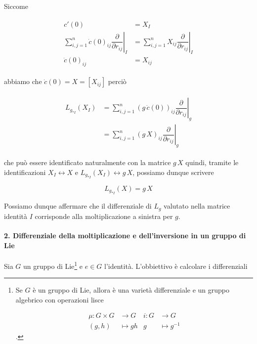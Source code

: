 Siccome

\begin{align}
	\begin{split}
		c'(0) &= X_{I}\\
		\sum_{i,j=1}^{n} \dot{c}(0)_{ij} \left. \dfrac{\partial}{\partial r_{ij}} \right|_{I} &= \sum_{i,j=1}^{n} X_{ij} \left. \dfrac{\partial}{\partial r_{ij}} \right|_{I}\\
		\dot{c}(0)_{ij} &= X_{ij}
	\end{split}
\end{align}

abbiamo che $ \dot{c}(0) = X = [X_{ij}] $ perciò

\begin{align}
	\begin{split}
		L_{g_{*I}}(X_{I}) &= \sum_{i,j=1}^{n} (g \, \dot{c}(0))_{ij} \left. \dfrac{\partial}{\partial r_{ij}} \right|_{g}\\
		&= \sum_{i,j=1}^{n} (g \, X)_{ij} \left. \dfrac{\partial}{\partial r_{ij}} \right|_{g}
	\end{split}
\end{align}

che può essere identificato naturalmente con la matrice $ g \, X $ quindi, tramite le identificazioni $ X_{I} \leftrightarrow X $ e $ L_{g_{*I}}(X_{I}) \leftrightarrow g \, X $, possiamo dunque scrivere

\begin{equation}
	L_{g_{*I}}(X) = g \, X
\end{equation}

Possiamo dunque affermare che il differenziale di $ L_{g} $ valutato nella matrice identità $ I $ corrisponde alla moltiplicazione a sinistra per $ g $.

\paragraph{2. Differenziale della moltiplicazione e dell'inversione in un gruppo di Lie}

Sia $ G $ un gruppo di Lie\footnote{%
	Se $ G $ è un gruppo di Lie, allora è una varietà differenziale e un gruppo algebrico con operazioni lisce
	
	\begin{align}
		\mu : G \times G &\to G & i : G &\to G\nonumber\\
		(g,h) &\mapsto g h & g &\mapsto g^{-1}
	\end{align}.%
} e $ e \in G $ l'identità. L'obbiettivo è calcolare i differenziali


